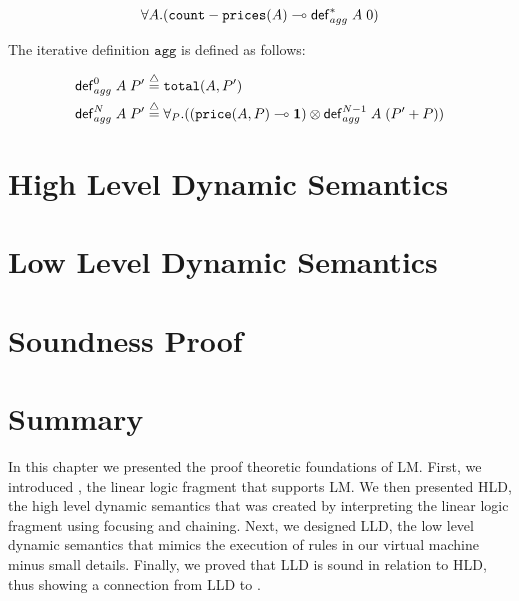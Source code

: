 \begin{align}
\forall A. (\mathtt{count-prices}(A) \multimap \mathsf{def}_{agg}^{*} \; A \; 0)
\end{align}

The iterative definition $\mathtt{agg}$ is defined as follows:

\begin{align}
\iterz{agg}{0} A \; P' & \defeq \mathtt{total}(A, P') \\
\iterz{agg}{N} A \; P' & \defeq \forall_P. ((\mathtt{price}(A, P) \lolli \one)
      \otimes \iterz{agg}{N-1} A \; (P' + P))
\end{align}

\section{High Level Dynamic Semantics}



\section{Low Level Dynamic Semantics}

\section{Soundness Proof}

\section{Summary}

In this chapter we presented the proof theoretic foundations of LM.  First, we
introduced \fragment, the linear logic fragment that supports LM. We then
presented HLD, the high level dynamic semantics that was created by interpreting
the linear logic fragment using focusing and chaining. Next, we designed LLD,
the low level dynamic semantics that mimics the execution of rules in our
virtual machine minus small details.  Finally, we proved that LLD is sound
in relation to HLD, thus showing a connection from LLD to \fragment.

